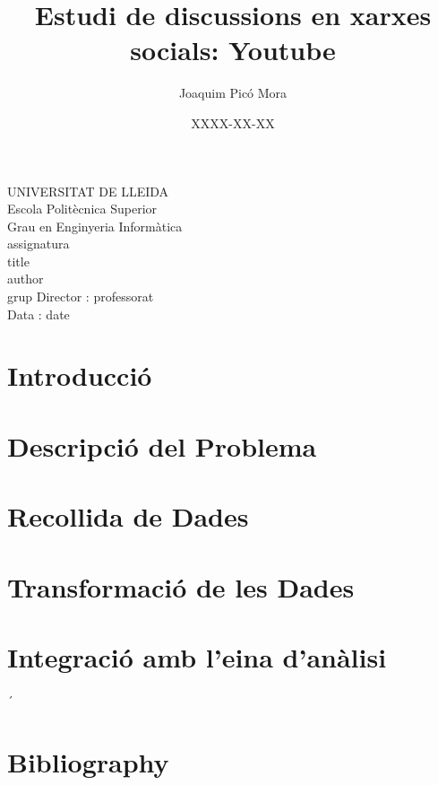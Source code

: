 \documentclass{article}
\title{Estudi de discussions en xarxes socials: Youtube}
\author{Joaquim Picó Mora}
\date{XXXX-XX-XX}
\renewcommand{\maketitle}{ %
	\begin{titlepage}
		\raggedright{UNIVERSITAT DE LLEIDA \\
			Escola Politècnica Superior \\
			Grau en Enginyeria Informàtica\\
			\1assignatura\\}
		\vspace{5cm}
		\centering\huge{\5title \\}
		\vspace{3cm}
		\large{\6author} \\
		\normalsize{\3grup}
		\vfill
		Director : \4professorat \\
		Data : \7date
\end{titlepage}}
\begin{document}
	\maketitle
	\thispagestyle{empty}
	\newpage
	\tableofcontents
	\newpage
	\section{Introducció}
	
	\section{Descripció del Problema}
	
	\section{Recollida de Dades}
	
	\section{Transformació de les Dades}
	
	\section{Integració amb l'eina d'anàlisi}
	´
	\section{Bibliography}
	
	
\end{document}
